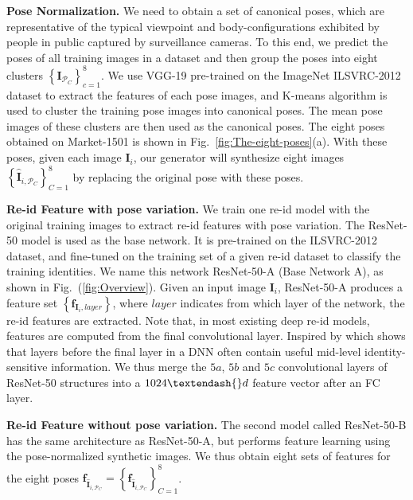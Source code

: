 \documentclass[10pt,letterpaper,twocolumn,10pt,letterpaper,twocolumn]{article}
\begin{document}
\vspace{0.03in}

\noindent \textbf{Pose Normalization. } We need to obtain a set of
canonical poses, which are representative of the typical viewpoint
and body-configurations exhibited by people in public captured by
surveillance cameras. To this end, we predict the poses of all training
images in a dataset and then group the poses into eight clusters $\left\{ \mathbf{I}_{\mathcal{P}_{C}}\right\} _{c=1}^{8}$.
We use VGG-19 \cite{returnDevil2014BMVC} pre-trained on the ImageNet ILSVRC-2012
dataset to extract the features of each pose images, and K-means algorithm
is used to cluster the  training pose images into canonical poses.
The mean pose images of these clusters are then used as the canonical
poses. The eight poses obtained on Market-1501 \cite{market1501} is shown in Fig.~\ref{fig:The-eight-poses}(a).
With these poses, given each image $\mathbf{I}_{i}$, our generator
will synthesize eight images $\left\{ \hat{\mathbf{I}}_{i,\mathcal{P}_{C}}\right\} _{C=1}^{8}$
by replacing the original pose with these poses.

\vspace{0.03in}

\noindent \textbf{Re-id Feature with pose variation. } We train one
re-id model with the original training images to extract re-id features with pose variation. The ResNet-50 model \cite{resnet}
is used as the base network. It is pre-trained on the
ILSVRC-2012 dataset, and fine-tuned on the training set of a given
re-id dataset to classify the training identities. We name this network
ResNet-50-A (Base Network A), as shown in Fig.~(\ref{fig:Overview}). Given
an input image $\mathbf{I}_{i}$, ResNet-50-A produces a feature set
$\left\{ \mathbf{f}_{\mathbf{I}_{i},layer}\right\} $, where $layer$
indicates from which layer of the network, the re-id features are
extracted. Note that, in most existing deep re-id models, features
are computed from the final convolutional layer. Inspired by \cite{liu2017hydraplus}
which shows that layers before the final layer in a DNN often contain
useful mid-level identity-sensitive information. We thus merge the
$5a$, $5b$ and $5c$ convolutional layers of ResNet-50 structures
into a $1024\textendash{}d$ feature vector after an FC layer.

\noindent \textbf{Re-id Feature without pose variation. } The second
model called ResNet-50-B has the same architecture as ResNet-50-A, but performs
feature learning using the pose-normalized synthetic images. We thus
obtain eight sets of features for the eight poses $\mathbf{f}_{\hat{\mathbf{I}}{}_{i,\mathcal{P}_{C}}}=\left\{ \mathbf{f}_{\hat{\mathbf{I}}_{i,\mathcal{P}_{C}}}\right\} _{C=1}^{8}$.
\end{document}
